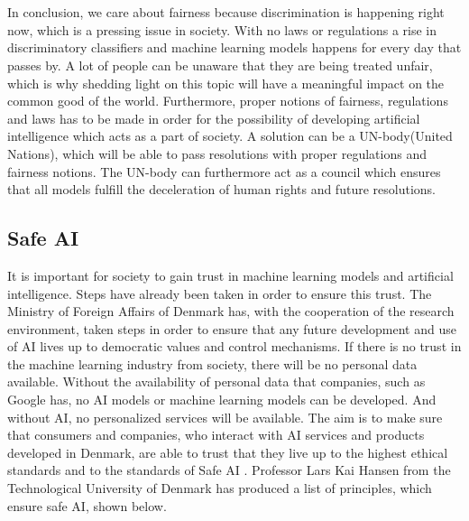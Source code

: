 \documentclass[11pt, fleqn, titlepage]{article}
\begin{document}
	\\\\
	In conclusion, we care about fairness because discrimination is happening right now, which is a pressing issue in society. With no laws or regulations a rise in discriminatory classifiers and machine learning models happens for every day that passes by. A lot of people can be unaware that they are being treated unfair, which is why shedding light on this topic will have a meaningful impact on the common good of the world. Furthermore, proper notions of fairness, regulations and laws has to be made in order for the possibility of developing artificial intelligence which acts as a part of society. A solution can be a UN-body(United Nations), which will be able to pass resolutions with proper regulations and fairness notions. The UN-body can furthermore act as a council which ensures that all models fulfill the deceleration of human rights and future resolutions. 
	
	
	
	
	\subsection{Safe AI}\label{safeai}
	It is important for society to gain trust in machine learning models and artificial intelligence. Steps have already been taken in order to ensure this trust. The Ministry of Foreign Affairs of Denmark has, with the cooperation of the research environment, taken steps in order to ensure that any future development and use of AI lives up to democratic values and control mechanisms. If there is no trust in the machine learning industry from society, there will be no personal data available. Without the availability of personal data that companies, such as Google has, no AI models or machine learning models can be developed. And without AI, no personalized services will be available. The aim is to make sure that consumers and companies, who interact with AI services and products developed in Denmark, are able to trust that they live up to the highest ethical standards and to the standards of Safe AI \cite{larsk}. Professor Lars Kai Hansen from the Technological University of Denmark has produced a list of principles, which ensure safe AI, shown  below. 
	
\end{document}

